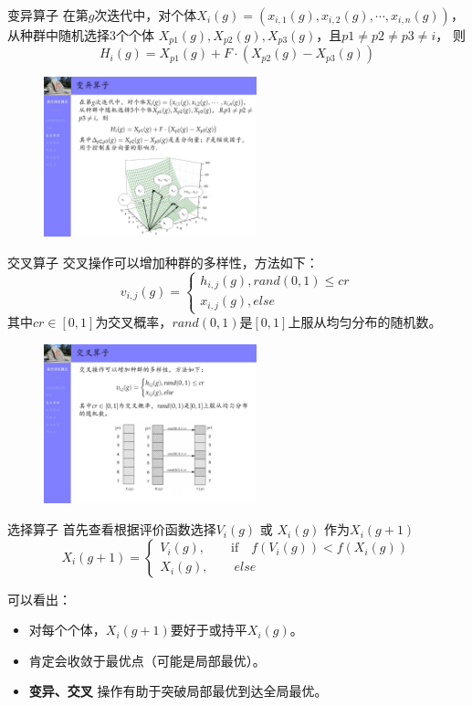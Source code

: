 \begin{frame}{变异算子}
	在第$g$次迭代中，对个体$X_i(g)=\left(x_{i,1}(g),x_{i,2}(g),\cdots,x_{i,n}(g)\right)$，从种群中随机选择$3$个个体 $X_{p1}(g),X_{p2}(g),X_{p3}(g)$，且$ p1 \neq p2 \neq p3\neq i$， 则
	$$H_{i}(g) = X_{p1}(g)+ F\cdot\left(X_{p2}(g)-X_{p3}(g)\right)$$
	\begin{figure}
		\includegraphics [width =0.55\textwidth]{../images/mutation.png}
	\end{figure}
\end{frame}

\begin{frame}{交叉算子}
	交叉操作可以增加种群的多样性，方法如下：
	$$
	v_{i,j}(g)=
	\begin{cases}
	h_{i,j}(g), rand(0,1)\le cr\\
	x_{i,j}(g), else
	\end{cases}
	$$
	其中$cr\in[0,1]$为交叉概率，$rand(0,1)$是$[0,1]$上服从均匀分布的随机数。

	\begin{figure}
		\includegraphics [width =0.55\textwidth]{../images/cross.png}
	\end{figure}
\end{frame}

\begin{frame}{选择算子}
首先查看根据评价函数选择$V_i(g)$ 或 $X_i(g)$ 作为$X_i(g+1)$
$$
	X_i(g+1) =
	\begin{cases}
	V_i(g),\qquad \mathrm{if} \quad f(V_i(g))< f(X_i(g))\\
	X_i(g),\qquad else
	\end{cases}
$$

可以看出：
	\begin{itemize}
		\item 对每个个体，$X_i(g+1)$要好于或持平$X_i(g)$。
		\item 肯定会收敛于最优点（可能是局部最优）。
		\item {\bf 变异、交叉} 操作有助于突破局部最优到达全局最优。
	\end{itemize}
\end{frame}

